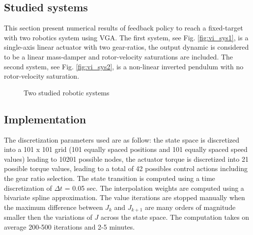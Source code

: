 %

\subsection{Studied systems}

This section present numerical results of feedback policy to reach a fixed-target with two robotics system using VGA. The first system, see Fig. \ref{fig:vi_sys1}, is a single-axis linear actuator with two gear-ratios, the output dynamic is considered to be a linear mass-damper and rotor-velocity saturations are included. The second system, see Fig. \ref{fig:vi_sys2}, is a non-linear inverted pendulum with no rotor-velocity saturation. 
%
\begin{figure}[htp]
        \centering
				\hspace{+5pt}
       \caption{Two studied robotic systems}
			\label{fig:studiedsys}
\end{figure}
%

\subsection{Implementation}
\label{sec:Methodology}

The discretization parameters used are as follow: the state space is discretized into a 101 x 101 grid (101 equally spaced positions and 101 equally spaced speed values) leading to 10201 possible nodes, the actuator torque is discretized into 21 possible torque values, leading to a total of 42 possibles control actions including the gear ratio selection. The state transition is computed using a time discretization of $\Delta t$ = 0.05 sec. The interpolation weights are computed using a bivariate spline approximation. The value iterations are stopped manually when the maximum difference between $J_k$ and $J_{k+1}$ are many orders of magnitude smaller then the variations of $J$ across the state space. The computation takes on average 200-500 iterations and 2-5 minutes.

